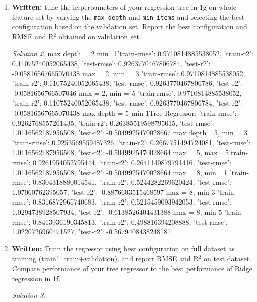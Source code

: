 \documentclass[a4paper,12pt]{article}
\theoremstyle{definition}
\theoremstyle{remark}
\newtheorem*{solution}{Solution}
\begin{document}
\begin{enumerate}
\begin{enumerate}
\begin{solution}
			\end{solution}
			\item {\bf Written:} tune the hyperpameters of your regression tree in 1g on whole feature set by varying the {\tt max\_depth}
			and {\tt min\_items} and selecting the best configuration based on the validation set. Report the best configuration
			and RMSE and R$^2$ obtained on validation set.
			\begin{solution}
				max depth = 2 min=1{'train-rmse': 0.9710814885538052, 'train-r2': 0.11075240052065438, 'test-rmse': 0.9263770467806784, 'test-r2': -0.05816567665070438}
				max = 2, min = 3 {'train-rmse': 0.9710814885538052, 'train-r2': 0.11075240052065438, 'test-rmse': 0.9263770467806786, 'test-r2': -0.0581656766507046}
				max = 2, min = 5 {'train-rmse': 0.9710814885538052, 'train-r2': 0.11075240052065438, 'test-rmse': 0.9263770467806784, 'test-r2': -0.05816567665070438}
				max depth = 5 min 1Tree Regressor:
				{'train-rmse': 0.9262768557261435, 'train-r2': 0.26385519598795015, 'test-rmse': 1.0116562187956508, 'test-r2': -0.5049925470028667}
				max depth =5, min = 3 {'train-rmse': 0.9253569559487326, 'train-r2': 0.2667751494724081, 'test-rmse': 1.0116562187956508, 'test-r2': -0.5049925470028664}
				max = 5, max =5{'train-rmse': 0.9261954052795444, 'train-r2': 0.2641140879791416, 'test-rmse': 1.0116562187956508, 'test-r2': -0.5049925470028664}
				max = 8, min =1 {'train-rmse': 0.8304318880014541, 'train-r2': 0.5244282269620424, 'test-rmse': 1.07060762395057, 'test-r2': -0.8876603515468597}
				max = 8, min 3 {'train-rmse': 0.8316872965740683, 'train-r2': 0.5215459093942053, 'test-rmse': 1.0294738928507934, 'test-r2': -0.6138526404431388}
				max = 8, min 5 {'train-rmse': 0.8413936190345813, 'train-r2': 0.498816394208888, 'test-rmse': 1.0220726960471527, 'test-r2': -0.5679408438248181}
			\end{solution}
			\item {\bf Written:} Train the regressor using best configuration on full dataset as training (train’=train+validation), and report RMSE and R$^2$ on test dataset. Compare performance of your tree regressor to the best performance of Ridge regression in 1f.
			\begin{solution}
				

\end{solution}
\end{enumerate}
\end{enumerate}
\end{document}

